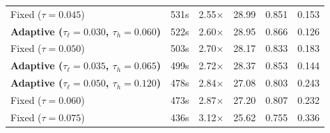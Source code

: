 \documentclass{article}
\begin{document}
\begin{table}[htbp]
\begin{tabular}{lrrccc}
  Fixed ($\tau=0.045$) & 531s & 2.55$\times$ & 28.99 & 0.851 & 0.153 \\
  \textbf{Adaptive ($\tau_\ell=0.030$, $\tau_h=0.060$)} & 522s & 2.60$\times$ & 28.95 & 0.866 & 0.126 \\
  Fixed ($\tau=0.050$) & 503s & 2.70$\times$ & 28.17 & 0.833 & 0.183 \\
  \textbf{Adaptive ($\tau_\ell=0.035$, $\tau_h=0.065$)} & 499s & 2.72$\times$ & 28.37 & 0.853 & 0.144 \\
  \textbf{Adaptive ($\tau_\ell=0.050$, $\tau_h=0.120$)} & 478s & 2.84$\times$ & 27.08 & 0.803 & 0.243 \\
  Fixed ($\tau=0.060$) & 473s & 2.87$\times$ & 27.20 & 0.807 & 0.232 \\
  Fixed ($\tau=0.075$) & 436s & 3.12$\times$ & 25.62 & 0.755 & 0.336 \\
\bottomrule
\end{tabular}
\end{table}
\end{document}
